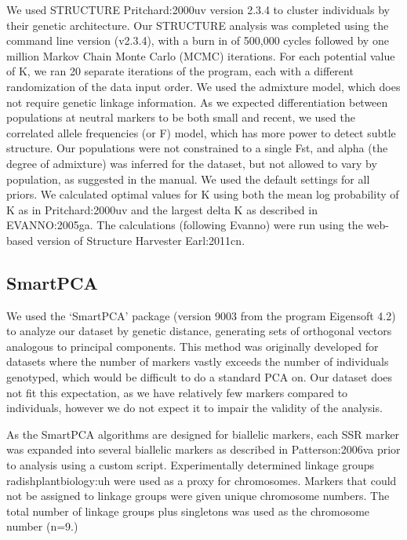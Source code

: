 \documentclass[twocolumn]{bmcart}%
\begin{document}
We used STRUCTURE {Pritchard:2000uv} version 2.3.4 to cluster individuals by their genetic architecture. Our STRUCTURE analysis was completed using the command line version (v2.3.4), with a burn in of 500,000 cycles followed by one million Markov Chain Monte Carlo (MCMC) iterations. For each potential value of K, we ran 20 separate iterations of the program, each with a different randomization of the data input order. We used the admixture model, which does not require genetic linkage information. As we expected differentiation between populations at neutral markers to be both small and recent, we used the correlated allele frequencies (or F) model, which has more power to detect subtle structure. Our populations were not constrained to a single Fst, and alpha (the degree of admixture) was inferred for the dataset, but not allowed to vary by population, as suggested in the manual. We used the default settings for all priors. We calculated optimal values for K using both the mean log probability of K as in {Pritchard:2000uv} and the largest delta K as described in {EVANNO:2005ga}. The calculations (following Evanno) were run using the web-based version of Structure Harvester {Earl:2011cn}.
%
%
%

\subsection*{SmartPCA}

We used the ‘SmartPCA’ package (version 9003 from the program Eigensoft 4.2) to analyze our dataset by genetic distance, generating sets of orthogonal vectors analogous to principal components. This method was originally developed for datasets where the number of markers vastly exceeds the number of individuals genotyped, which would be difficult to do a standard PCA on. Our dataset does not fit this expectation, as we have relatively few markers compared to individuals, however we do not expect it to impair the validity of the analysis.

As the SmartPCA algorithms are designed for biallelic markers, each SSR marker was expanded into several biallelic markers as described in {Patterson:2006va} prior to analysis using a custom script. Experimentally determined linkage groups {radishplantbiology:uh} were used as a proxy for chromosomes. Markers that could not be assigned to linkage groups were given unique chromosome numbers. The total number of linkage groups plus singletons was used as the chromosome number (n=9.)
\end{document}
